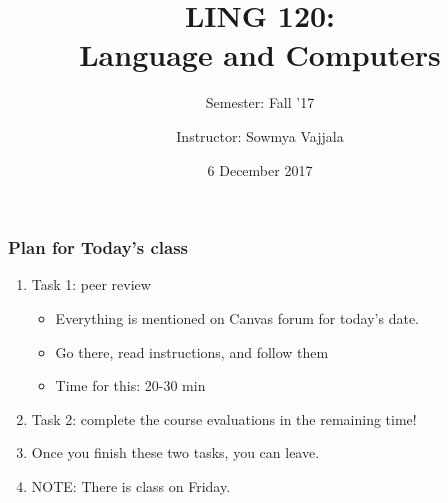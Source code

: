 \documentclass{beamer}
\author[Sowmya Vajjala]{Instructor: Sowmya Vajjala}
\title[LING 120]{LING 120: \\ Language and Computers}
\subtitle{Semester: Fall '17}
\date{6 December 2017}
\institute{Iowa State University, USA}
\begin{document}
\begin{frame}\titlepage
\end{frame}

\begin{frame}
\frametitle{Plan for Today's class}
\begin{enumerate}
\item Task 1: peer review
\begin{itemize}
\item Everything is mentioned on Canvas forum for today's date.
\item Go there, read instructions, and follow them
\item Time for this: 20-30 min
\end{itemize}
\item Task 2: complete the course evaluations in the remaining time!
\item Once you finish these two tasks, you can leave.
\item NOTE: There is class on Friday. 
\end{enumerate}
\end{frame}
\end{document}
